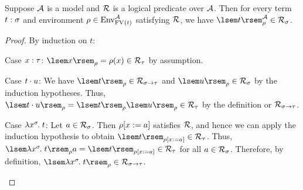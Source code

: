 \begin{thm} \label{thm:fundamental-thm-log-rel}
Suppose $\mathcal{A}$ is a model and $\mathcal{R}$ is a logical predicate over $\mathcal{A}$. Then for every term $t : \sigma$ and environment $\rho \in \Env[\FV{t}][\struct{A}]$ satisfying $\mathcal{R}$, we have $\sint[\struct{A}]{t}{\rho} \in \scomp{\struct{R}}{\sigma}$.
\begin{proof}
By induction on $t$:
\begin{items}
\item Case $x : \tau$:
$\sint{x}{\rho} = \rho(x) \in \scomp{\struct{R}}{\tau}$ by assumption.
\item Case $t \cdot u$:
We have $\sint{t}{\rho} \in \scomp{\struct{R}}{\functy{\sigma}{\tau}}$ and $\sint{u}{\rho} \in \scomp{\struct{R}}{\sigma}$ by the induction hypotheses. Thus, $\sint{\app{t}{u}}{\rho} = \sint{t}{\rho} \sint{u}{\rho} \in \scomp{\struct{R}}{\tau}$ by the definition or $\mathcal{R}_{\sigma \to \tau}$.
\item Case $\lambda x^{\sigma}\hspace{-1pt}.\;t$:
Let $a \in \mathcal{R}_{\sigma}$. Then $\rho[x := a]$ satisfies $\mathcal{R}$, and hence we can apply the induction hypothesis to obtain $\sint{t}{\updenv{\rho}{x}{a}} \in \scomp{\struct{R}}{\tau}$. Thus, $\sint{\lamv{x}{\sigma}{t}}{\rho} a = \sint{t}{\updenv{\rho}{x}{a}} \in \scomp{\struct{R}}{\tau}$ for all $a \in \mathcal{R}_{\sigma}$. Therefore, by definition, $\sint{\lamv{x}{\sigma}{t}}{\rho} \in \scomp{\struct{R}}{\functy{\sigma}{\tau}}$. \qedhere
\end{items}
\end{proof}
\end{thm}

